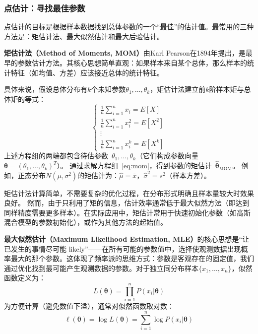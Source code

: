 \subsubsection{点估计：寻找最佳参数}

点估计的目标是根据样本数据找到总体参数的一个``最佳''的估计值。最常用的三种方法是：矩估计法、最大似然估计和最大后验估计。

\textbf{矩估计法（Method of Moments, MOM）}由Karl Pearson在1894年提出，是最早的参数估计方法。其核心思想简单直观：如果样本来自某个总体，那么样本的统计特征（如均值、方差）应该接近总体的统计特征。

具体来说，假设总体分布有$k$个未知参数$\theta_1, \ldots, \theta_k$，矩估计法建立前$k$阶样本矩与总体矩的等式：
\begin{equation}\label{eq:mom}
\begin{cases}
\frac{1}{n}\sum_{i=1}^n x_i = E[X] \\
\frac{1}{n}\sum_{i=1}^n x_i^2 = E[X^2] \\
\vdots \\
\frac{1}{n}\sum_{i=1}^n x_i^k = E[X^k]
\end{cases}
\end{equation}
上述方程组的两端都包含待估参数~$\theta_1, \ldots, \theta_k$（它们构成参数向量~$\boldsymbol{\theta} = (\theta_1, \ldots, \theta_k)^T$）。
通过求解方程组~\eqref{eq:mom}，得到参数的矩估计~$\hat{\boldsymbol{\theta}}_\text{MOM}$。
例如，正态分布$N(\mu, \sigma^2)$的矩估计为：$\hat{\mu} = \bar{x}$，$\hat{\sigma}^2 = s^2$（样本方差）。

矩估计法计算简单，不需要复杂的优化过程，在分布形式明确且样本量较大时效果良好。
然而，由于只利用了矩的信息，估计效率通常低于最大似然方法（即达到同样精度需要更多样本）。在实际应用中，矩估计常用于快速初始化参数（如高斯混合模型的参数初始化），或作为其他方法的起始值。

\textbf{最大似然估计（Maximum Likelihood Estimation, MLE）}的核心思想是``让已发生的事情尽可能 likely''——在所有可能的参数值中，选择使观测数据出现概率最大的那个参数。这体现了频率派的思维方式：参数是客观存在的固定值，我们通过优化找到最可能产生观测数据的参数。对于独立同分布样本$\{x_1, \ldots, x_n\}$，似然函数定义为：
\begin{equation}\label{eq:mle}
L(\boldsymbol{\theta}) = \prod_{i=1}^n P(x_i|\boldsymbol{\theta})
\end{equation}
为方便计算（避免数值下溢），通常对似然函数取对数：
\begin{equation}
\ell(\boldsymbol{\theta}) = \log L(\boldsymbol{\theta}) = \sum_{i=1}^n \log P(x_i|\boldsymbol{\theta})
\end{equation}

